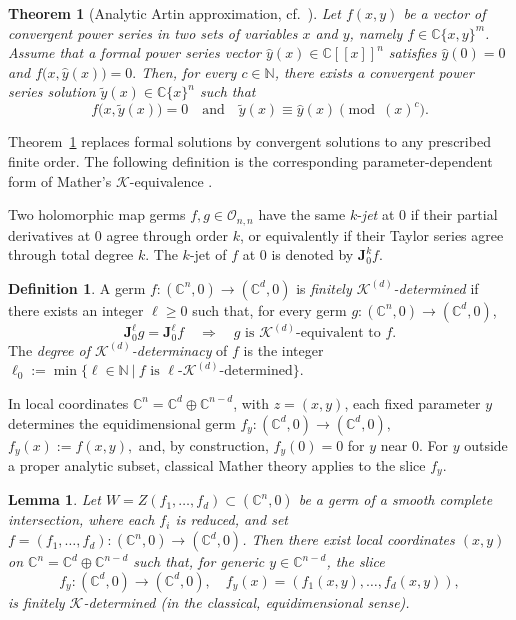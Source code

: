 \documentclass[10pt,twoside]{amsart}
\numberwithin{equation}{section}
\newtheorem{theorem}[proposition]{Theorem}
\newtheorem{lemma}[proposition]{Lemma}
\theoremstyle{definition}
\newtheorem{definition}[proposition]{Definition}
\theoremstyle{remark}
\begin{document}
\begin{theorem}[Analytic Artin approximation, cf.\ \cite{ArtinApprox2018}]\label{thm:ArtinApprox}
Let $f(x,y)$ be a vector of convergent power series in two sets of variables $x$ and $y$, namely
$f\in \mathbb{C}\{x,y\}^{m}$.
Assume that a formal power series vector $\widehat y(x)\in \mathbb{C}[[x]]^{n}$ satisfies $\widehat y(0)=0$ and $
f\bigl(x,\widehat y(x)\bigr)=0.
$
Then, for every $c\in\mathbb{N}$, there exists a convergent power series solution
$\widetilde y(x)\in \mathbb{C}\{x\}^{n}$ such that
\[
f\bigl(x,\widetilde y(x)\bigr)=0
\quad\text{and}\quad
\widetilde y(x)\equiv \widehat y(x)\pmod{(x)^c}.
\]
\end{theorem}

Theorem~\ref{thm:ArtinApprox} replaces formal solutions by convergent solutions to any prescribed finite order. The following definition is the corresponding parameter-dependent form of Mather's $\mathcal K$-equivalence \cite{MT1,MT2}.

Two holomorphic map germs $f,g\in\mathcal O_{n,n}$ have the same $k$-\emph{jet} at $0$ if their partial derivatives at $0$ agree through order $k$, or equivalently if their Taylor series agree through total degree $k$. The $k$-jet of $f$ at $0$ is denoted by $\mathbf J_0^kf$.

\begin{definition}\label{def:Kd-determinacy}
A germ $f:(\mathbb{C}^n,0)\to(\mathbb{C}^d,0)$ is \emph{finitely $\mathcal{K}^{(d)}$-determined} if there exists an integer $\ell\geq 0$
such that, for every germ $g:(\mathbb{C}^n,0)\to(\mathbb{C}^d,0)$,
\[
\mathbf{J}_0^{\ell}g=\mathbf{J}_0^{\ell}f
\quad\Longrightarrow\quad
g \text{ is } \mathcal{K}^{(d)}\text{-equivalent to } f.
\]
The \emph{degree of $\mathcal{K}^{(d)}$-determinacy} of $f$ is the integer
$
\ell_0:=\min\bigl\{\ell\in\mathbb{N}\ \big|\ f\text{ is } \ell\text{-}\mathcal{K}^{(d)}\text{-determined}\bigr\}.
$
\end{definition}

In local coordinates $\mathbb C^n=\mathbb C^d\oplus\mathbb C^{n-d}$, with $z=(x,y)$, each fixed parameter $y$ determines the equidimensional germ
$
f_y:(\mathbb{C}^d,0)\to(\mathbb{C}^d,0),
$ $
f_y(x):=f(x,y),
$
and, by construction, $f_y(0)=0$ for $y$ near $0$.
For $y$ outside a proper analytic subset, classical Mather theory applies to the slice $f_y$.

\medskip

\begin{lemma}\label{subvariedad}
Let $W=Z(f_1,\ldots,f_d)\subset(\mathbb{C}^n,0)$ be a germ of a smooth complete intersection, where each $f_i$ is reduced, and set
$f=(f_1,\ldots,f_d):(\mathbb{C}^n,0)\to(\mathbb{C}^d,0)$.
Then there exist local coordinates $(x,y)$ on $\mathbb{C}^n=\mathbb{C}^d\oplus \mathbb{C}^{n-d}$ such that,
for generic $y\in\mathbb{C}^{n-d}$, the slice
\[
f_y:(\mathbb{C}^d,0)\to(\mathbb{C}^d,0),
\quad
f_y(x)=(f_1(x,y),\ldots,f_d(x,y)),
\]
is finitely $\mathcal{K}$-determined (in the classical, equidimensional sense).
\end{lemma}
\end{document}
